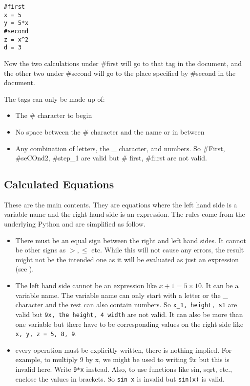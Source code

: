 \documentclass[12pt]{article}
\begin{document}
\begin{verbatim}
#first
x = 5
y = 5*x
#second
z = x^2
d = 3
\end{verbatim}

Now the two calculations under \#first will go to that tag in the document, and
the other two under \#second will go to the place specified by \#second in the
document.

The tags can only be made up of:
\begin{itemize}
\setlength\itemsep{0pt}
    \item The \# character to begin
    \item No space between the \# character and the name or in between
    \item Any combination of letters, the \_ character, and numbers. So
        \#First, \#seCOnd2, \#step\_1 are valid but \# first, \#fi;rst are not
        valid.
\end{itemize}

\subsection{Calculated Equations}

These are the main contents. They are equations where the left hand side is a
variable name and the right hand side is an expression.  The rules come from
the underlying Python and are simplified as follow.

\begin{itemize}
    \setlength\itemsep{0pt}
    \item There must be an equal sign between the right and left hand sides. It
        cannot be other signs as $>, \leq$ etc. While this will not cause any
        errors, the result might not be the intended one as it will be
        evaluated as just an expression (see ).
    \item The left hand side cannot be an expression like $x + 1 = 5 \times
        10$. It can be a variable name. The variable name can only start with a
        letter or the \_ character and the rest can also contain numbers. So
        \verb|x_1, height, s1| are valid but \verb|9x, the height, 4 width| are
        not valid. It can also be more than one variable but there have to be
        corresponding values on the right side like \verb|x, y, z = 5, 8, 9|.
    \item every operation must be explicitly written, there is nothing implied.
        For example, to multiply 9 by x, we might be used to writing $9x$ but
        this is invalid here. Write \verb|9*x| instead. Also, to use functions
        like sin, sqrt, etc., enclose the values in brackets. So \verb|sin x|
        is invalid but \verb|sin(x)| is valid.
\end{itemize}
\end{document}
